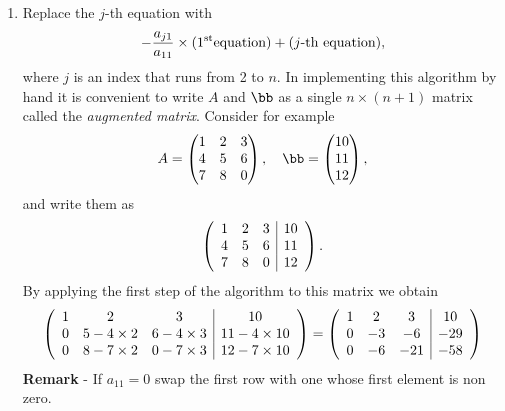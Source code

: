 \begin{enumerate}

\item Replace the $j$-th equation with
%
  \begin{equation*}
    -\frac{a_{j 1}}{a_{1 1}} \times ( 1^{\rm st} \text{equation} ) +
    ( j\text{-th equation} ) ,
  \end{equation*}
%
where $j$ is an index that runs from 2 to $n$.  In implementing this
algorithm by hand it is convenient to write $A$ and $\bb$ as a single
$n \times (n+1)$ matrix called the \textit{augmented matrix}.
Consider for example 
%
\begin{equation*}
  A =
  \begin{pmatrix}
    1 & 2 & 3 \\ 4 & 5 & 6 \\ 7 & 8 & 0
  \end{pmatrix}
 , \quad
  \bb =
  \begin{pmatrix}
    10 \\ 11 \\ 12
  \end{pmatrix},
\end{equation*}
%
and write them as
%
\begin{equation*}
\left (
  \begin{array}{c c c|c}
   1 & 2 & 3 & 10 \\ 4 & 5 & 6 & 11 \\ 7 & 8 & 0 & 12 \\
  \end{array}
 \right ) .
\end{equation*}
%
By applying the first step of the algorithm to this matrix we obtain
%
\begin{equation*}
  \left (
  \begin{array}{c c c|c}
   1 & 2 & 3 & 10 \\ 
   0 & 5 - 4 \times 2 & 6 - 4 \times 3 & 11 - 4 \times 10 \\  
   0 & 8 - 7 \times 2 & 0 - 7  \times 3 & 12 - 7 \times 10
  \end{array}
 \right ) =
 \left (
  \begin{array}{c c c|c}
   1 & 2 & 3 & 10 \\ 
   0 & -3 & -6 & -29 \\ 
   0 & -6 & -21 & -58
  \end{array}
 \right )
\end{equation*}
%
{\bf Remark} - If $a_{1 1}=0$ swap the first row with one whose first
element is non zero.


\end{enumerate}
